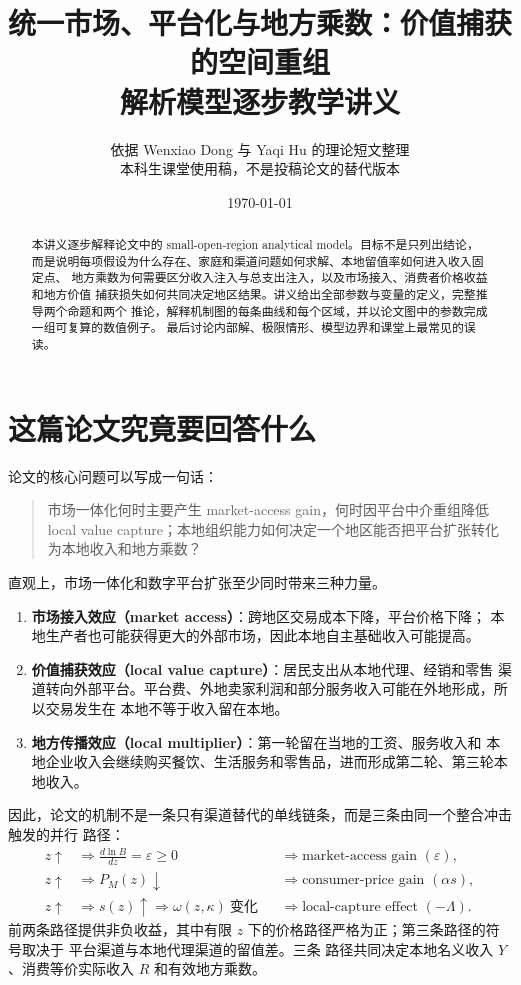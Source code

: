 \documentclass[UTF8,11pt,scheme=chinese,fontset=fandol]{ctexart}
\title{\textbf{统一市场、平台化与地方乘数：价值捕获的空间重组}\\[0.5em]
\large 解析模型逐步教学讲义}
\author{依据 Wenxiao Dong 与 Yaqi Hu 的理论短文整理\\
\small 本科生课堂使用稿，不是投稿论文的替代版本}
\date{\today}
\theoremstyle{definition}
\begin{document}
\maketitle

\begin{abstract}
本讲义逐步解释论文中的 small-open-region analytical model。目标不是只列出结论，
而是说明每项假设为什么存在、家庭和渠道问题如何求解、本地留值率如何进入收入固定点、
地方乘数为何需要区分收入注入与总支出注入，以及市场接入、消费者价格收益和地方价值
捕获损失如何共同决定地区结果。讲义给出全部参数与变量的定义，完整推导两个命题和两个
推论，解释机制图的每条曲线和每个区域，并以论文图中的参数完成一组可复算的数值例子。
最后讨论内部解、极限情形、模型边界和课堂上最常见的误读。
\end{abstract}

\tableofcontents
\clearpage

\section{这篇论文究竟要回答什么}

论文的核心问题可以写成一句话：

\begin{quote}
市场一体化何时主要产生 market-access gain，何时因平台中介重组降低 local value
capture；本地组织能力如何决定一个地区能否把平台扩张转化为本地收入和地方乘数？
\end{quote}

直观上，市场一体化和数字平台扩张至少同时带来三种力量。

\begin{enumerate}
  \item \textbf{市场接入效应（market access）}：跨地区交易成本下降，平台价格下降；
  本地生产者也可能获得更大的外部市场，因此本地自主基础收入可能提高。
  \item \textbf{价值捕获效应（local value capture）}：居民支出从本地代理、经销和零售
  渠道转向外部平台。平台费、外地卖家利润和部分服务收入可能在外地形成，所以交易发生在
  本地不等于收入留在本地。
  \item \textbf{地方传播效应（local multiplier）}：第一轮留在当地的工资、服务收入和
  本地企业收入会继续购买餐饮、生活服务和零售品，进而形成第二轮、第三轮本地收入。
\end{enumerate}

因此，论文的机制不是一条只有渠道替代的单线链条，而是三条由同一个整合冲击触发的并行
路径：
\[
\boxed{
\begin{aligned}
z\uparrow
&\Longrightarrow \frac{d\ln B}{dz}=\varepsilon\geq0
&&\Longrightarrow \text{market-access gain }(\varepsilon),\\
z\uparrow
&\Longrightarrow P_M(z)\downarrow
&&\Longrightarrow \text{consumer-price gain }(\alpha s),\\
z\uparrow
&\Longrightarrow s(z)\uparrow
\Longrightarrow \omega(z,\kappa)\ \text{变化}
&&\Longrightarrow \text{local-capture effect }(-\Lambda).
\end{aligned}}
\]
前两条路径提供非负收益，其中有限 \(z\) 下的价格路径严格为正；第三条路径的符号取决于
平台渠道与本地代理渠道的留值差。三条
路径共同决定本地名义收入 \(Y\)、消费等价实际收入 \(R\) 和有效地方乘数。
\end{document}
